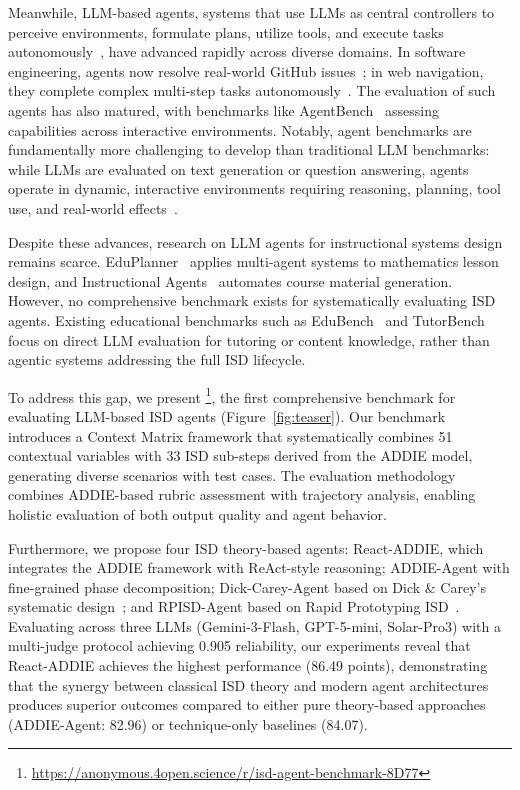Meanwhile, LLM-based agents, systems that use LLMs as central controllers to perceive environments, formulate plans, utilize tools, and execute tasks autonomously~\cite{wang2024llmagentsurvey}, have advanced rapidly across diverse domains. In software engineering, agents now resolve real-world GitHub issues~\cite{jimenez2024swebench}; in web navigation, they complete complex multi-step tasks autonomously~\cite{zhou2023webarena}. The evaluation of such agents has also matured, with benchmarks like AgentBench~\cite{liu2023agentbench} assessing capabilities across interactive environments. Notably, agent benchmarks are fundamentally more challenging to develop than traditional LLM benchmarks: while LLMs are evaluated on text generation or question answering, agents operate in dynamic, interactive environments requiring reasoning, planning, tool use, and real-world effects~\cite{mohammadi2025agenteval}.

Despite these advances, research on LLM agents for instructional systems design remains scarce. EduPlanner~\cite{zhang2025eduplanner} applies multi-agent systems to mathematics lesson design, and Instructional Agents~\cite{yao2025instructionalagents} automates course material generation. However, no comprehensive benchmark exists for systematically evaluating ISD agents. Existing educational benchmarks such as EduBench~\cite{edubench2025} and TutorBench~\cite{tutorbench2025} focus on direct LLM evaluation for tutoring or content knowledge, rather than agentic systems addressing the full ISD lifecycle.

To address this gap, we present \benchmark{}\footnote{\url{https://anonymous.4open.science/r/isd-agent-benchmark-8D77}}, the first comprehensive benchmark for evaluating LLM-based ISD agents (Figure~\ref{fig:teaser}). Our benchmark introduces a Context Matrix framework that systematically combines 51 contextual variables with 33 ISD sub-steps derived from the ADDIE model, generating \numscenarios{} diverse scenarios with \numtest{} test cases. The evaluation methodology combines ADDIE-based rubric assessment with trajectory analysis, enabling holistic evaluation of both output quality and agent behavior.

Furthermore, we propose four ISD theory-based agents: React-ADDIE, which integrates the ADDIE framework with ReAct-style reasoning; ADDIE-Agent with fine-grained phase decomposition; Dick-Carey-Agent based on Dick \& Carey's systematic design~\cite{dick1978systematic}; and RPISD-Agent based on Rapid Prototyping ISD~\cite{tripp1990rapid}. Evaluating across three LLMs (Gemini-3-Flash, GPT-5-mini, Solar-Pro3) with a multi-judge protocol achieving 0.905 reliability, our experiments reveal that React-ADDIE achieves the highest performance (86.49 points), demonstrating that the synergy between classical ISD theory and modern agent architectures produces superior outcomes compared to either pure theory-based approaches (ADDIE-Agent: 82.96) or technique-only baselines (84.07).

